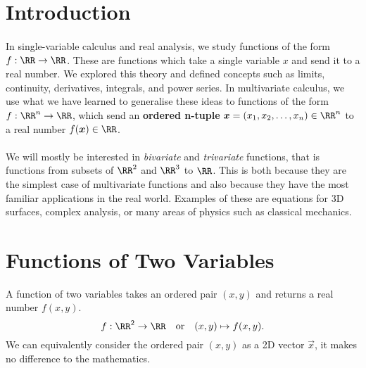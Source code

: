 \documentclass[../multivariate_calculus.tex]{subfiles}
\begin{document}
    \section{Introduction}
        \paragraph{}
        In single-variable calculus and real analysis, we study functions of the form $f:\RR\to\RR$.
        These are functions which take a single variable $x$ and send it to a real number.
        We explored this theory and defined concepts such as limits, continuity, derivatives, integrals, and power series.
        In multivariate calculus, we use what we have learned to generalise these ideas to functions of the form $f:\RR^n\to\RR$, which send an \textbf{ordered n-tuple} $\vec{x}=(x_1,x_2,\dots,x_n)\in\RR^n$ to a real number $f(\vec{x})\in\RR$.

        \paragraph{}
        We will mostly be interested in \textit{bivariate} and \textit{trivariate} functions, that is functions from subsets of $\RR^2$ and $\RR^3$ to $\RR$.
        This is both because they are the simplest case of multivariate functions and also because they have the most familiar applications in the real world.
        Examples of these are equations for 3D surfaces, complex analysis, or many areas of physics such as classical mechanics.

    \section{Functions of Two Variables}
        \begin{definition}
            A function of two variables takes an ordered pair $(x,y)$ and returns a real number $f(x,y)$.
            \begin{equation}
                f:\RR^2\to\RR\quad\text{or}\quad(x,y)\mapsto f(x,y).
            \end{equation}
            We can equivalently consider the ordered pair $(x,y)$ as a 2D vector $\vec{x}$, it makes no difference to the mathematics.
        \end{definition}
\end{document}

